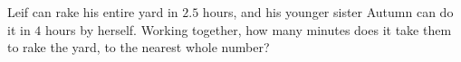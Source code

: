 Leif can rake his entire yard in $2.5$ hours, and his younger sister Autumn can do it in $4$ hours by herself. Working together, how many minutes does it take them to rake the yard, to the nearest whole number?
